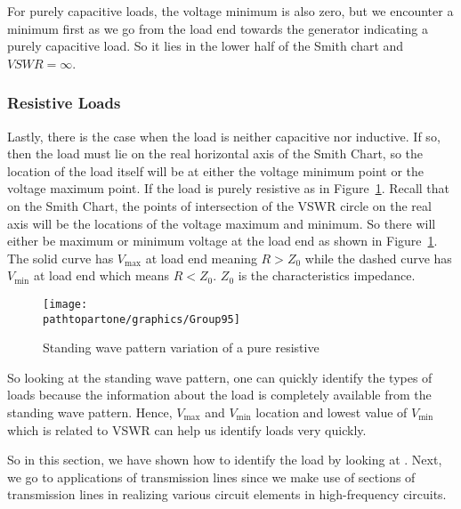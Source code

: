 For purely capacitive loads, the voltage minimum is also zero, but we encounter a minimum first as we go from the load end towards the generator indicating a purely capacitive load. So it lies in the lower half of the Smith chart and $VSWR=\infty$.

\subsubsection{Resistive Loads}
Lastly, there is the case when the load is neither capacitive nor inductive. If so, then the load must lie on the real horizontal axis of the Smith Chart, so the location of the load itself will be at either the voltage minimum point or the voltage maximum point. If the load is purely resistive as in Figure~\ref{fig:group95}. Recall that on the Smith Chart, the points of intersection of the VSWR circle on the real axis will be the locations of the voltage maximum and minimum. So there will either be maximum or minimum voltage at the load end as shown in Figure~\ref{fig:group95}. The solid curve has ${V_\max}$ at load end meaning ${R>Z_0}$ while the dashed curve has ${V_\min}$ at load end which means ${R<Z_0}$. ${Z_0}$ is the characteristics impedance.
\begin{figure}[h]
\centering
\texttt{[image: \\pathtopartone/graphics/Group95]}
\caption{Standing wave pattern variation of a pure resistive}
\label{fig:group95}
\end{figure}

So looking at the standing wave pattern, one can quickly identify the types of loads because the information about the load is completely available from the standing wave pattern. Hence, ${V_\max}$ and ${V_\min}$ location and lowest value of ${V_\min}$ which is related to VSWR can help us identify loads very quickly.

So in this section, we have shown how to identify the load by looking at . Next, we go to applications of transmission lines since we make use of sections of transmission lines in realizing various circuit elements in high-frequency circuits.



